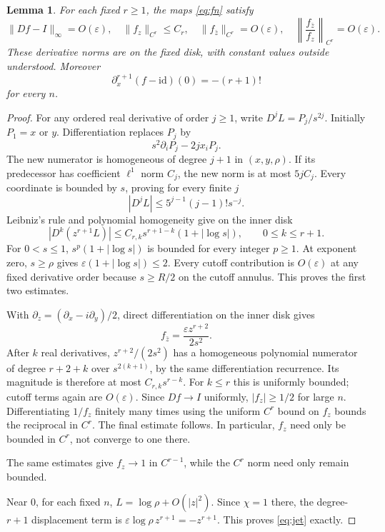 \documentclass[11pt]{article}
\newtheorem{lemma}{Lemma}
\newcommand{\id}{\mathrm{id}}
\begin{document}
\begin{lemma}\label{lem:bounds}
For each fixed $r\geq1$, the maps \eqref{eq:fn} satisfy
\[
 \|Df-I\|_\infty=O(\varepsilon),\quad
 \|f_z\|_{C^r}\leq C_r,\quad
 \|f_{\bar z}\|_{C^r}=O(\varepsilon),\quad
 \left\|\frac{f_{\bar z}}{f_z}\right\|_{C^r}=O(\varepsilon).
\]
These derivative norms are on the fixed disk, with constant values outside understood. Moreover
\begin{equation}\label{eq:jet}
 \partial_x^{r+1}(f-\id)(0)=-(r+1)!
\end{equation}
for every $n$.
\end{lemma}
\begin{proof}
For any ordered real derivative of order $j\geq1$, write $D^jL=P_j/s^{2j}$. Initially $P_1=x$ or $y$. Differentiation replaces $P_j$ by
\[
 s^2\partial_iP_j-2j x_iP_j.
\]
The new numerator is homogeneous of degree $j+1$ in $(x,y,\rho)$. If its predecessor has coefficient $\ell^1$ norm $C_j$, the new norm is at most $5jC_j$. Every coordinate is bounded by $s$, proving for every finite $j$
\[
 |D^jL|\leq5^{j-1}(j-1)!s^{-j}.
\]
Leibniz's rule and polynomial homogeneity give on the inner disk
\begin{equation}\label{eq:leibniz}
 |D^k(z^{r+1}L)|\leq C_{r,k}s^{r+1-k}(1+|\log s|),
 \qquad 0\leq k\leq r+1.
\end{equation}
For $0<s\leq1$, $s^p(1+|\log s|)$ is bounded for every integer $p\geq1$. At exponent zero, $s\geq\rho$ gives $\varepsilon(1+|\log s|)\leq2$. Every cutoff contribution is $O(\varepsilon)$ at any fixed derivative order because $s\geq R/2$ on the cutoff annulus. This proves the first two estimates.

With $\partial_z=(\partial_x-i\partial_y)/2$, direct differentiation on the inner disk gives
\[
 f_{\bar z}=\frac{\varepsilon z^{r+2}}{2s^2}.
\]
After $k$ real derivatives, $z^{r+2}/(2s^2)$ has a homogeneous polynomial numerator of degree $r+2+k$ over $s^{2(k+1)}$, by the same differentiation recurrence. Its magnitude is therefore at most $C_{r,k}s^{r-k}$. For $k\leq r$ this is uniformly bounded; cutoff terms again are $O(\varepsilon)$. Since $Df\to I$ uniformly, $|f_z|\geq1/2$ for large $n$. Differentiating $1/f_z$ finitely many times using the uniform $C^r$ bound on $f_z$ bounds the reciprocal in $C^r$. The final estimate follows. In particular, $f_z$ need only be bounded in $C^r$, not converge to one there.

The same estimates give $f_z\to1$ in $C^{r-1}$, while the $C^r$ norm need only remain bounded.

Near $0$, for each fixed $n$, $L=\log\rho+O(|z|^2)$. Since $\chi=1$ there, the degree-$r+1$ displacement term is $\varepsilon\log\rho\,z^{r+1}=-z^{r+1}$. This proves \eqref{eq:jet} exactly.
\end{proof}
\end{document}
